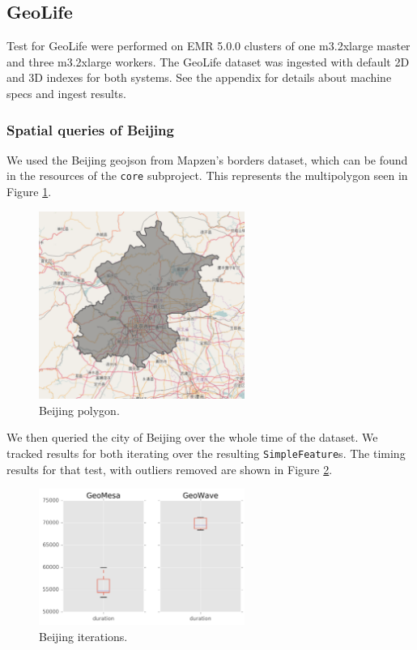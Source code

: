 \subsection{ GeoLife}

Test for GeoLife were performed on EMR 5.0.0 clusters of one m3.2xlarge master and three m3.2xlarge workers.
The GeoLife dataset was ingested with default 2D and 3D indexes for both systems.
See the appendix for details about machine specs and ingest results.

\subsubsection{Spatial queries of Beijing}

We used the Beijing geojson from Mapzen's borders dataset, which can be found in the resources of the \texttt{core} subproject.
This represents the multipolygon seen in Figure \ref{beijingpolygon}.

\begin{figure}[h!tb]
  \centering
  \includegraphics[width=0.60\textwidth]{../docs/img/beijing-poly.png}
  \caption{Beijing polygon.}
  \label{beijingpolygon}
\end{figure}

We then queried the city of Beijing over the whole time of the dataset.
We tracked results for both iterating over the resulting \texttt{SimpleFeature}s.
The timing results for that test, with outliers removed are shown in Figure \ref{beijingiterate}.

\begin{figure}[h!tb]
  \centering
  \includegraphics[width=0.60\textwidth]{../docs/img/geolife-beijing-iterate.png}
  \caption{Beijing iterations.}
  \label{beijingiterate}
\end{figure}

